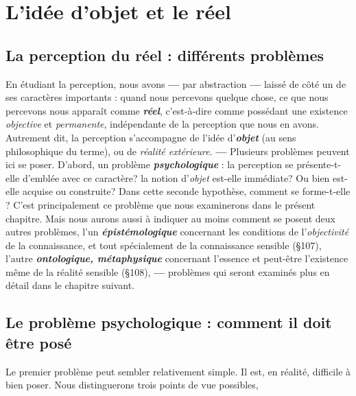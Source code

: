 \chapter{L'idée d'objet et le réel}
%


\section{La perception du réel : différents problèmes}%
En étudiant la perception, nous avons {\bf —} par abstraction {\bf —} laissé de
côté un de ses caractères importants : quand nous percevons quelque
chose, ce que nous percevons nous apparaît comme \textbf{\textit {réel}}, c’est-à-dire
comme possédant une existence {\it objective} et {\it permanente}, indépendante
de la perception que nous en avons. Autrement dit, la perception
s'accompagne de l’idée d'\textbf{\textit {objet}} (au sens philosophique du terme),
ou de {\it réalité extérieure}. {\bf —} Plusieurs problèmes peuvent ici se
poser. D’abord, un problème \textbf{\textit {psychologique}} : la perception se
présente-t-elle d'emblée avec ce caractère? la notion d’{\it objet} est-elle
immédiate? Ou bien est-elle acquise ou construite? Dans cette
seconde hypothèse, comment se forme-t-elle ? C’est principalement
ce problème que nous examinerons dans le présent chapitre. Mais
nous aurons aussi à indiquer au moins comment se posent deux autres
problèmes, l’un \textbf{\textit {épistémologique}} concernant les conditions de l’{\it objectivité}
de la connaissance, et tout spécialement de la connaissance
sensible (\S 107), l’autre \textbf{\textit {ontologique, métaphysique}} concernant l’essence
et peut-être l’existence même de la réalité sensible (\S 108), {\bf —} problèmes
qui seront examinés plus en détail dans le chapitre suivant.

\section{Le problème psychologique : comment il doit être posé}%
Le premier problème peut sembler relativement simple. Il est,
en réalité, difficile à bien poser. Nous distinguerons trois points de
vue possibles,

